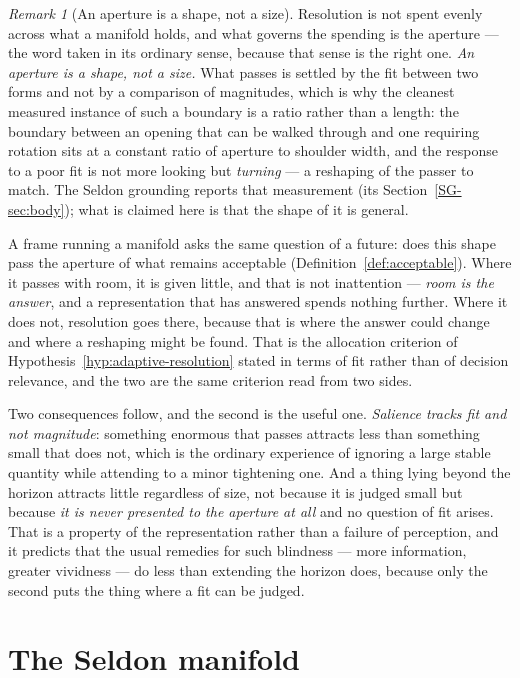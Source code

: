 \documentclass[11pt,a4paper]{article}
\theoremstyle{remark}
\newtheorem{remark}[definition]{Remark}
\begin{document}
\begin{remark}[An aperture is a shape, not a size]\label{rem:aperture-shape}
Resolution is not spent evenly across what a manifold holds, and what governs the spending is the
aperture --- the word taken in its ordinary sense, because that sense is the right one.
\emph{An aperture is a shape, not a size.} What passes is settled by the fit between two forms and
not by a comparison of magnitudes, which is why the cleanest measured instance of such a boundary is
a ratio rather than a length: the boundary between an opening that can be walked through and one
requiring rotation sits at a constant ratio of aperture to shoulder width, and the response to a poor
fit is not more looking but \emph{turning} --- a reshaping of the passer to match. The Seldon
grounding reports that measurement (its Section~\ref{SG-sec:body}); what is claimed here is that the
shape of it is general.

A frame running a manifold asks the same question of a future: does this shape pass the aperture of
what remains acceptable (Definition~\ref{def:acceptable}). Where it passes with room, it is given
little, and that is not inattention --- \emph{room is the answer}, and a representation that has
answered spends nothing further. Where it does not, resolution goes there, because that is where the
answer could change and where a reshaping might be found. That is the allocation criterion of
Hypothesis~\ref{hyp:adaptive-resolution} stated in terms of fit rather than of decision relevance,
and the two are the same criterion read from two sides.

Two consequences follow, and the second is the useful one. \emph{Salience tracks fit and not
magnitude}: something enormous that passes attracts less than something small that does not, which is
the ordinary experience of ignoring a large stable quantity while attending to a minor tightening one.
And a thing lying beyond the horizon attracts little regardless of size, not because it is judged
small but because \emph{it is never presented to the aperture at all} and no question of fit arises.
That is a property of the representation rather than a failure of perception, and it predicts that the
usual remedies for such blindness --- more information, greater vividness --- do less than extending
the horizon does, because only the second puts the thing where a fit can be judged.
\end{remark}

\section{The Seldon manifold}\label{sec:seldon}
\end{document}
